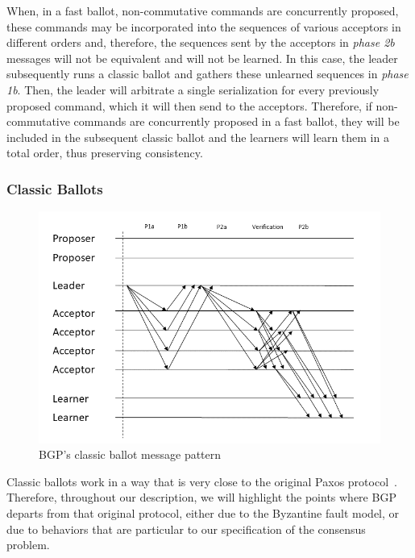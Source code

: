  When, in a fast ballot, non-commutative commands are concurrently proposed, these commands may be incorporated into the sequences of various acceptors in different orders and, therefore, the sequences sent by the acceptors in \textit{phase 2b} messages will not be equivalent and will not be learned. In this case, the leader subsequently runs a classic ballot and gathers these unlearned sequences in \textit{phase 1b}. Then, the leader will arbitrate a single serialization for every previously proposed command, which it will then send to the acceptors. Therefore, if non-commutative commands are concurrently proposed in a fast ballot, they will be included in the subsequent classic ballot and the learners will learn them in a total order, thus preserving consistency.

\subsubsection{Classic Ballots} 

\begin{figure}
	\centering
	\includegraphics[width=\textwidth*2/3]{Figures/bgp_classic}
	\caption{BGP's classic ballot message pattern}
	\label{bgp_classic}
\end{figure}
Classic ballots work in a way that is very close to the original Paxos protocol~\cite{Lamport:1998}. Therefore, throughout our description, we will highlight the points where BGP departs from that original protocol, either due to the Byzantine fault model, or due to behaviors that are particular to our specification of the consensus problem.\par


